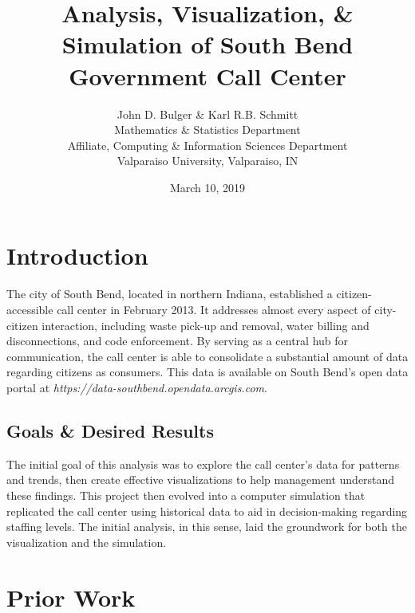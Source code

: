 \documentclass[12pt]{article}
\title{Analysis, Visualization, \& Simulation of South Bend Government Call Center}
\author{John D. Bulger \& Karl R.B. Schmitt\\
	Mathematics \& Statistics Department\\
	Affiliate, Computing \& Information Sciences Department
	\\Valparaiso University, Valparaiso, IN}
\date{March 10, 2019}
\begin{document}
\maketitle
\section{Introduction}
The city of South Bend, located in northern Indiana, established a citizen-accessible call center in February 2013.  It addresses almost every aspect of city-citizen interaction, including waste pick-up and removal, water billing and disconnections, and code enforcement.  By serving as a central hub for communication, the call center is able to consolidate a substantial amount of data regarding citizens as consumers.  This data is available on South Bend's open data portal at \textit{https://data-southbend.opendata.arcgis.com}.

\subsection{Goals \& Desired Results}

The initial goal of this analysis was to explore the call center's data for patterns and trends, then create effective visualizations to help management understand these findings.  This project then evolved into a computer simulation that replicated the call center using historical data to aid in decision-making regarding staffing levels.  The initial analysis, in this sense, laid the groundwork for both the visualization and the simulation.

\section{Prior Work}
	
\end{document}
